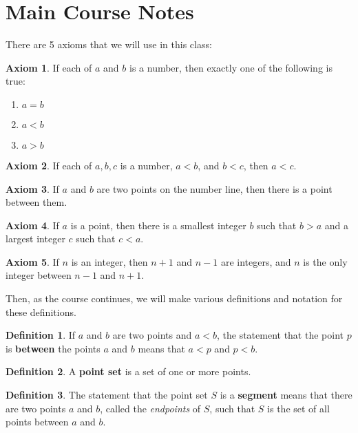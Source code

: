 \documentclass{article}
\theoremstyle{definition}
\newtheorem{axiom}{Axiom}
\newtheorem{definition}{Definition}
\begin{document}
\section*{Main Course Notes}
There are 5 axioms that we will use in this class:

\begin{axiom}
If each of $a$ and $b$ is a number, then exactly one of the following is true:
\begin{enumerate}
\item
$a = b$
\item
$a < b$
\item
$a > b$
\end{enumerate}
\end{axiom}

\begin{axiom}
If each of $a, b, c$ is a number, $a < b$, and $b < c$, then $a < c$.
\end{axiom}

\begin{axiom}
If $a$ and $b$ are two points on the number line, then there is a point between them.
\end{axiom}

\begin{axiom}
If $a$ is a point, then there is a smallest integer $b$ such that $b > a$ and a largest integer $c$ such that $c < a$.
\end{axiom}

\begin{axiom}
If $n$ is an integer, then $n + 1$ and $n - 1$ are integers, and $n$ is the only integer between $n - 1$ and $n + 1$.
\end{axiom}

Then, as the course continues, we will make various definitions and notation for these definitions.

\begin{definition}
If $a$ and $b$ are two points and $a < b$, the statement that the point $p$ is \textbf{between} the points $a$ and $b$ means that $a < p$ and $p < b$.
\end{definition}

\begin{definition}
A \textbf{point set} is a set of one or more points.
\end{definition}

\begin{definition}
The statement that the point set $S$ is a \textbf{segment} means that there are two points $a$ and $b$, called the \textit{endpoints} of $S$, such that $S$ is the set of all points between $a$ and $b$. 
\end{definition}
\end{document}
